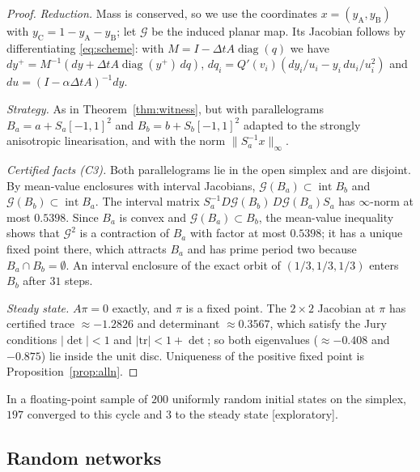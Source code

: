 \documentclass[11pt,a4paper]{article}
\theoremstyle{plain}
\theoremstyle{definition}
\newcommand{\diag}{\operatorname{diag}}
\newcommand{\status}[1]{\textsf{[#1]}}
\begin{document}
\begin{proof}
\emph{Reduction.} Mass is conserved, so we use the coordinates $x=(y_{\mathrm A},y_{\mathrm B})$ with $y_{\mathrm C}=1-y_{\mathrm A}-y_{\mathrm B}$; let $\mathcal G$ be the induced planar map. Its Jacobian follows by differentiating \eqref{eq:scheme}: with $M=I-\Delta tA\diag(q)$ we have $dy^+=M^{-1}(dy+\Delta tA\diag(y^+)\,dq)$, $dq_i=Q'(v_i)(dy_i/u_i-y_i\,du_i/u_i^2)$ and $du=(I-\alpha\Delta tA)^{-1}dy$.

\emph{Strategy.} As in Theorem~\ref{thm:witness}, but with parallelograms $B_a=a+S_a[-1,1]^2$ and $B_b=b+S_b[-1,1]^2$ adapted to the strongly anisotropic linearisation, and with the norm $\|S_a^{-1}x\|_\infty$.

\emph{Certified facts (C3).} Both parallelograms lie in the open simplex and are disjoint. By mean-value enclosures with interval Jacobians, $\mathcal G(B_a)\subset\operatorname{int}B_b$ and $\mathcal G(B_b)\subset\operatorname{int}B_a$. The interval matrix $S_a^{-1}D\mathcal G(B_b)\,D\mathcal G(B_a)S_a$ has $\infty$-norm at most $0.5398$. Since $B_a$ is convex and $\mathcal G(B_a)\subset B_b$, the mean-value inequality shows that $\mathcal G^2$ is a contraction of $B_a$ with factor at most $0.5398$; it has a unique fixed point there, which attracts $B_a$ and has prime period two because $B_a\cap B_b=\emptyset$. An interval enclosure of the exact orbit of $(1/3,1/3,1/3)$ enters $B_b$ after $31$ steps.

\emph{Steady state.} $A\pi=0$ exactly, and $\pi$ is a fixed point. The $2\times2$ Jacobian at $\pi$ has certified trace $\approx-1.2826$ and determinant $\approx0.3567$, which satisfy the Jury conditions $|\det|<1$ and $|\mathrm{tr}|<1+\det$; so both eigenvalues ($\approx-0.408$ and $-0.875$) lie inside the unit disc. Uniqueness of the positive fixed point is Proposition~\ref{prop:alln}.
\end{proof}

In a floating-point sample of $200$ uniformly random initial states on the simplex, $197$ converged to this cycle and $3$ to the steady state \status{exploratory}.

\subsection{Random networks}\label{sec:random}
\end{document}
